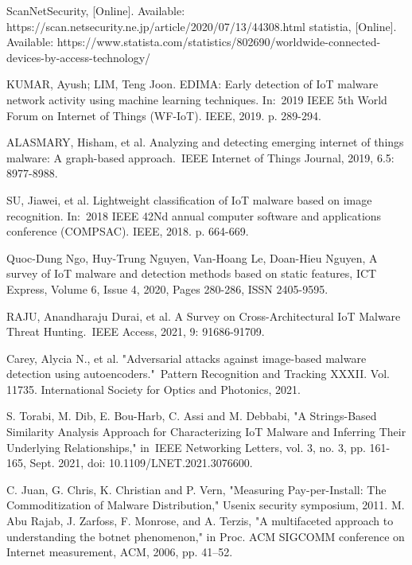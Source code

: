 \newpage
\begin{thebibliography}{99}


ScanNetSecurity, [Online]. Available: https://scan.netsecurity.ne.jp/article/2020/07/13/44308.html
statistia, [Online]. Available: https://www.statista.com/statistics/802690/worldwide-connected-devices-by-access-technology/

KUMAR, Ayush; LIM, Teng Joon. EDIMA: Early detection of IoT malware network activity using machine learning techniques. In: 2019 IEEE 5th World Forum on Internet of Things (WF-IoT). IEEE, 2019. p. 289-294.

ALASMARY, Hisham, et al. Analyzing and detecting emerging internet of things malware: A graph-based approach. IEEE Internet of Things Journal, 2019, 6.5: 8977-8988.


SU, Jiawei, et al. Lightweight classification of IoT malware based on image recognition. In: 2018 IEEE 42Nd annual computer software and applications conference (COMPSAC). IEEE, 2018. p. 664-669.

Quoc-Dung Ngo, Huy-Trung Nguyen, Van-Hoang Le, Doan-Hieu Nguyen, A survey of IoT malware and detection methods based on static features, ICT Express, Volume 6, Issue 4, 2020, Pages 280-286, ISSN 2405-9595.

RAJU, Anandharaju Durai, et al. A Survey on Cross-Architectural IoT Malware Threat Hunting. IEEE Access, 2021, 9: 91686-91709.

Carey, Alycia N., et al. "Adversarial attacks against image-based malware detection using autoencoders." Pattern Recognition and Tracking XXXII. Vol. 11735. International Society for Optics and Photonics, 2021.

S. Torabi, M. Dib, E. Bou-Harb, C. Assi and M. Debbabi, "A Strings-Based Similarity Analysis Approach for Characterizing IoT Malware and Inferring Their Underlying Relationships," in IEEE Networking Letters, vol. 3, no. 3, pp. 161-165, Sept. 2021, doi: 10.1109/LNET.2021.3076600.

C. Juan, G. Chris, K. Christian and P. Vern,
"Measuring Pay-per-Install: The Commoditization of Malware Distribution,"
Usenix security symposium, 2011.
M. Abu Rajab, J. Zarfoss, F. Monrose, and A. Terzis,
"A multifaceted approach to understanding the botnet phenomenon,"
in Proc. ACM SIGCOMM conference on Internet measurement,
ACM, 2006, pp. 41--52.


\end{thebibliography}
